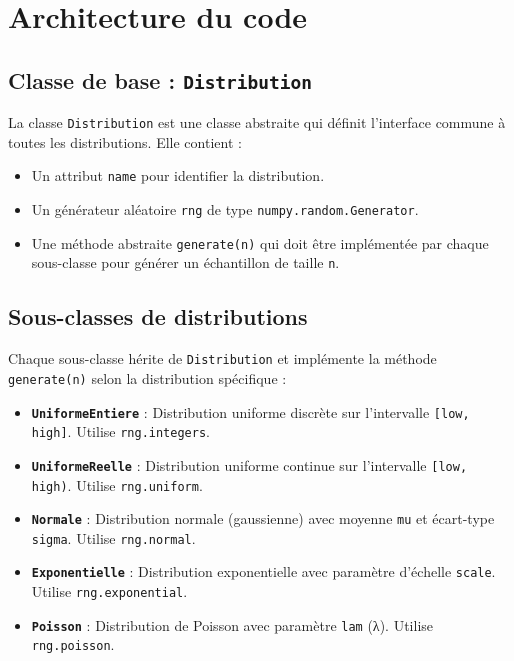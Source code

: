 \documentclass{article}
\begin{document}
\section{Architecture du code}  
\subsection{Classe de base : \texttt{Distribution}}  
La classe \texttt{Distribution} est une classe abstraite qui définit l'interface commune à toutes les distributions. Elle contient :  
\begin{itemize}  
    \item Un attribut \texttt{name} pour identifier la distribution.  
    \item Un générateur aléatoire \texttt{rng} de type \texttt{numpy.random.Generator}.  
    \item Une méthode abstraite \texttt{generate(n)} qui doit être implémentée par chaque sous-classe pour générer un échantillon de taille \texttt{n}.  
\end{itemize}

\subsection{Sous-classes de distributions}  
Chaque sous-classe hérite de \texttt{Distribution} et implémente la méthode \texttt{generate(n)} selon la distribution spécifique :

\begin{itemize}  
    \item \textbf{\texttt{UniformeEntiere}} : Distribution uniforme discrète sur l'intervalle \texttt{[low, high]}. Utilise \texttt{rng.integers}.  
    \item \textbf{\texttt{UniformeReelle}} : Distribution uniforme continue sur l'intervalle \texttt{[low, high)}. Utilise \texttt{rng.uniform}.  
    \item \textbf{\texttt{Normale}} : Distribution normale (gaussienne) avec moyenne \texttt{mu} et écart-type \texttt{sigma}. Utilise \texttt{rng.normal}.  
    \item \textbf{\texttt{Exponentielle}} : Distribution exponentielle avec paramètre d'échelle \texttt{scale}. Utilise \texttt{rng.exponential}.  
    \item \textbf{\texttt{Poisson}} : Distribution de Poisson avec paramètre \texttt{lam} (λ). Utilise \texttt{rng.poisson}.  
\end{itemize}
\end{document}
